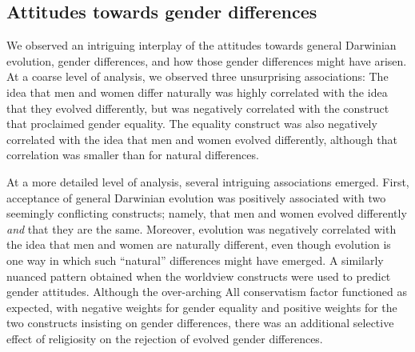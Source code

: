 \documentclass[fignum,man]{apa}\usepackage[]{graphicx}\usepackage[]{color}
\begin{document}
\subsection{Attitudes towards gender differences}
We observed an intriguing 
interplay of the attitudes towards general Darwinian evolution,
gender differences, and how those gender differences
might have arisen.
At a coarse level of analysis, we
observed three unsurprising associations: The idea that 
men and women differ naturally was highly 
correlated with the idea that they evolved differently, but
was negatively correlated with
the construct that proclaimed gender equality. 
The equality construct was 
also negatively
correlated with the idea that men and women evolved differently,
although that correlation was smaller than for 
natural differences. 

At a more detailed level of analysis, several
intriguing associations emerged.
First, acceptance of general Darwinian evolution was 
positively associated with two seemingly conflicting constructs; 
namely, that men and women evolved differently \textit{and} that they are
the same. Moreover, evolution was negatively correlated with the idea
that men and women are naturally different, even though evolution
is one way in which such ``natural'' differences might have emerged.
A similarly nuanced  pattern obtained when the 
worldview constructs were used to predict 
gender attitudes. Although the over-arching All conservatism
factor functioned as expected, with negative weights for gender equality 
and positive weights for the two constructs insisting on
gender differences, 
there was an additional selective effect of religiosity on 
the rejection of evolved gender differences.
\end{document}
